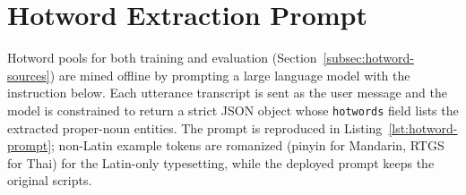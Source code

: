 \appendix
\section{Hotword Extraction Prompt}
\label{sec:appendix-hotword-prompt}

Hotword pools for both training and evaluation
(Section~\ref{subsec:hotword-sources}) are mined offline by prompting a
large language model with the instruction below. Each utterance
transcript is sent as the user message and the model is constrained to
return a strict JSON object whose \texttt{hotwords} field lists the
extracted proper-noun entities. The prompt is reproduced in
Listing~\ref{lst:hotword-prompt}; non-Latin example tokens are
romanized (pinyin for Mandarin, RTGS for Thai) for the Latin-only
typesetting, while the deployed prompt keeps the original scripts.

